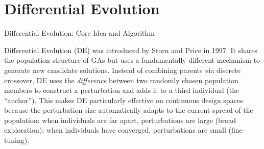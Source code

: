 \documentclass[aspectratio=169,10pt]{beamer}
\begin{document}
\section{Differential Evolution}

\begin{frame}[allowframebreaks]{Differential Evolution: Core Idea and Algorithm}

  Differential Evolution (DE) was introduced by Storn and Price in
  1997.  It shares the population structure of GAs but uses a
  fundamentally different mechanism to generate new candidate
  solutions.  Instead of combining parents via discrete crossover,
  DE uses the \emph{difference} between two randomly chosen population
  members to construct a perturbation and adds it to a third
  individual (the ``anchor'').  This makes DE particularly effective
  on continuous design spaces because the perturbation size
  automatically adapts to the current spread of the population:
  when individuals are far apart, perturbations are large (broad
  exploration); when individuals have converged, perturbations are
  small (fine-tuning).


\end{frame}
\end{document}
